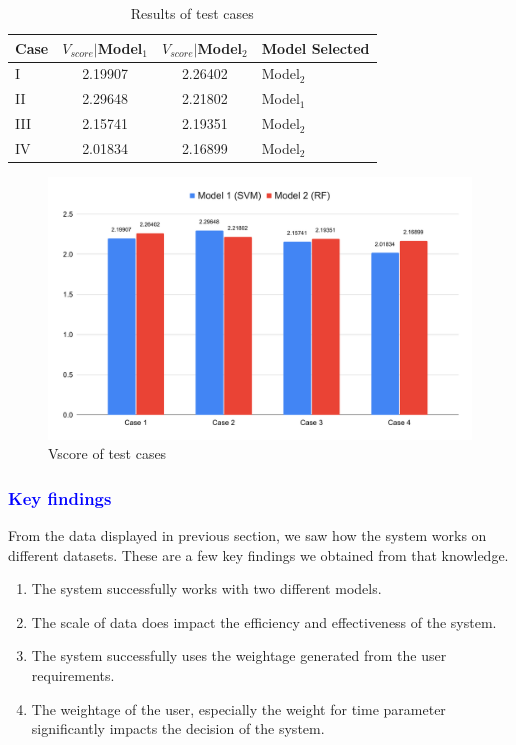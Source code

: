 \documentclass[a4paper,fleqn]{cas-dc}
\newcommand{\responsemodsm}[1]{\textcolor{blue}{#1}}
\newcommand{\subsubsectionb}[1]{\subsubsection{\responsemodsm{#1}}}
\begin{document}
\begin{table}[ht]
    \caption{Results of test cases}\label{tab:results_of_test_cases}
    \begin{tabular*}{\tblwidth}{@{}LCCL@{}}
        \toprule
        Case & $V_{score}|$Model$_1$ & $V_{score}|$Model$_2$ & Model Selected \\
        \midrule
        I & 2.19907 & 2.26402 & Model$_2$ \\
        II & 2.29648 & 2.21802 & Model$_1$ \\
        III & 2.15741 & 2.19351 & Model$_2$ \\
        IV & 2.01834 & 2.16899 & Model$_2$ \\
        \bottomrule
    \end{tabular*}
\end{table}

\begin{figure}[ht]
    \centering
    \includegraphics[width=2\columnwidth]{result_test_cases.pdf}
    \caption{Vscore of test cases}
    \label{fig:vscore_of_test_cases}
\end{figure}

\subsubsectionb{Key findings}\label{subsubsec:key_findings}

From the data displayed in previous section, we saw how the system works on different datasets. These are a few key findings we obtained from that knowledge.
\begin{enumerate}
    \item The system successfully works with two different models.
    \item The scale of data does impact the efficiency and effectiveness of the system.
    \item The system successfully uses the weightage generated from the user requirements.
    \item The weightage of the user, especially the weight for time parameter significantly impacts the decision of the system.
\end{enumerate}
\end{document}
